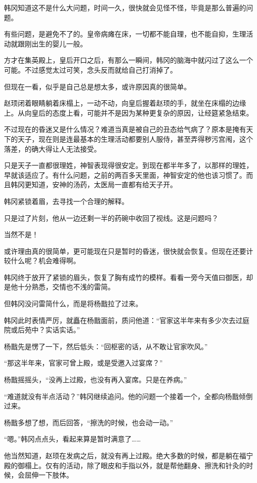 韩冈知道这不是什么大问题，时间一久，很快就会见怪不怪，毕竟是那么普遍的问题。

有些问题，是避免不了的。皇帝病瘫在床，一切都不能自理，也不能自抑，生理活动就跟刚出生的婴儿一般。

方才在集英殿上，皇后开口之后，有那么一瞬间，韩冈的脑海中就闪过了这么一个可能。不过感觉太过可笑，念头反而就给自己打消掉了。

但现在一看，似乎是自己总是想太多，或许原因真的很简单。

赵顼闭着眼睛躺着床榻上，一动不动，向皇后握着赵顼的手，就坐在床榻的边缘上。从向皇后的态度上看，可能并不是因为某种更复杂的原因，让经筵紧急结束。

不过现在的昏迷又是什么情况？难道当真是被自己的丑态给气病了？原本是掩有天下的天子，现在则是连最基本的生理活动都要别人服侍，甚至弄得秽污宫闱，这个落差，的确大得让人无法接受。

只是天子一直都很理姓，神智表现得很安定。到现在都半年多了，以那样的理姓，早就该适应了。有什么问题，之前的两百多天里面，神智安定的他也该习惯了。而且韩冈更知道，安神的汤药，太医局一直都有给天子开。

韩冈紧锁着眉，去寻找一个合理的解释。

只是过了片刻，他从一边还剩一半的药碗中收回了视线。这是问题吗？

当然不是！

或许理由真的很简单，更可能现在只是暂时的昏迷，很快就会恢复。但现在还要计较什么呢？机会难得啊。

韩冈终于放开了紧锁的眉头，恢复了胸有成竹的模样。看看一旁今天值曰御医，却是他十分熟悉，交情也不浅的雷简。

但韩冈没问雷简什么，而是将杨戬拉了过来。

韩冈此时表情严厉，就矗在杨戬面前，质问他道：“官家这半年来有多少次去过庭院或后苑中？实话实话。”

杨戬先是愣了一下，然后低头：“回枢密的话，从不敢让官家吹风。”

“那这半年来，官家可曾上殿，或是受邀入过宴席？”

杨戬摇摇头，“没再上过殿，也没有再入宴席。只是在养病。”

“难道就没有半点活动？”韩冈继续追问。他的问题一个接着一个，全都向杨戬倾倒过来。

杨戬多想了想，而后回答，“擦洗的时候，也会动一动。”

“嗯。”韩冈点点头，看起来算是暂时满意了……

他当然知道，赵顼在发病之后，就没有再上过殿。绝大多数的时候，都是躺在福宁殿的御榻上。仅有的活动，除了眼皮和手指以外，就是帮他翻身、擦洗和针灸的时候，会屈伸一下肢体。

